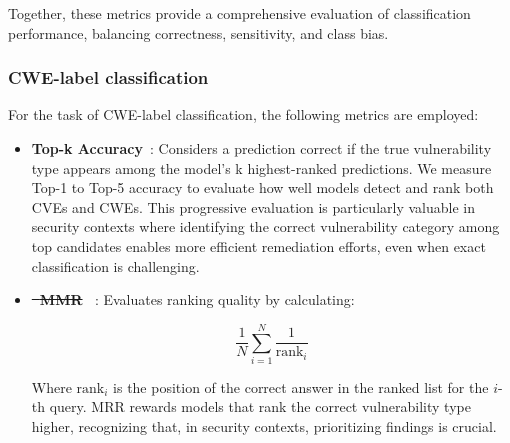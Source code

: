 \documentclass[lettersize,journal]{IEEEtran}
\makeatletter
\providecommand{\DIFadd}[1]{{\protect\color{blue}\uwave{#1}}} %
\providecommand{\DIFdel}[1]{{\protect\color{red}\sout{#1}}} %
\providecommand{\DIFaddbegin}{} %
\providecommand{\DIFaddend}{} %
\providecommand{\DIFdelbegin}{} %
\providecommand{\DIFdelend}{} %
\newcommand{\DIFscaledelfig}{0.5}
\newlength{\DIFdelgraphicswidth} %
\newlength{\DIFdelgraphicsheight} %
\newcommand{\DIFaddincludegraphics}[2][]{{\color{blue}\fbox{\DIFOincludegraphics[#1]{#2}}}} %
\newcommand{\DIFdelincludegraphics}[2][]{%
\sbox{\DIFdelgraphicsbox}{\DIFOincludegraphics[#1]{#2}}%
\settoboxwidth{\DIFdelgraphicswidth}{\DIFdelgraphicsbox} %
\settoboxtotalheight{\DIFdelgraphicsheight}{\DIFdelgraphicsbox} %
\scalebox{\DIFscaledelfig}{%
\parbox[b]{\DIFdelgraphicswidth}{\usebox{\DIFdelgraphicsbox}\\[-\baselineskip] \rule{\DIFdelgraphicswidth}{0em}}\llap{\resizebox{\DIFdelgraphicswidth}{\DIFdelgraphicsheight}{%
\setlength{\unitlength}{\DIFdelgraphicswidth}%
\begin{picture}(1,1)%
\thicklines\linethickness{2pt} %
{\color[rgb]{1,0,0}\put(0,0){\framebox(1,1){}}}%
{\color[rgb]{1,0,0}\put(0,0){\line( 1,1){1}}}%
{\color[rgb]{1,0,0}\put(0,1){\line(1,-1){1}}}%
\end{picture}%
}\hspace*{3pt}}} %
} %
\DeclareRobustCommand{\DIFaddbegin}{\DIFOaddbegin \let\includegraphics\DIFaddincludegraphics} %
\DeclareRobustCommand{\DIFaddend}{\DIFOaddend \let\includegraphics\DIFOincludegraphics} %
\DeclareRobustCommand{\DIFdelbegin}{\DIFOdelbegin \let\includegraphics\DIFdelincludegraphics} %
\DeclareRobustCommand{\DIFdelend}{\DIFOaddend \let\includegraphics\DIFOincludegraphics} %
\let\sout@orig\sout %
\renewcommand{\sout}[1]{\ifmmode\text{\sout@orig{\ensuremath{#1}}}\else\sout@orig{#1}\fi} %
\makeatother
\begin{document}
Together, these metrics provide a comprehensive evaluation of classification performance, balancing correctness, sensitivity, and class bias.

\subsubsection{CWE-label classification}
\label{section:cwe_metrics}
For the task of CWE-label classification, the following metrics are employed:

\begin{itemize}

	\item \textbf{Top-k Accuracy}~\cite{russakovsky2015imagenet}: Considers a prediction correct if the true vulnerability type appears among the model's k highest-ranked predictions. We measure Top-1 to Top-5 accuracy to evaluate how well models detect and rank both CVEs and CWEs. This progressive evaluation is particularly valuable in security contexts where identifying the correct vulnerability category among top candidates enables more efficient remediation efforts, even when exact classification is challenging.

	\item \textbf{\DIFdelbegin \DIFdel{\mbox{%
\gls{MMR}}\hskip0pt%
}\DIFdelend \DIFaddbegin \DIFadd{\mbox{%
\gls{MRR}}\hskip0pt%
}\DIFaddend }~\cite{craswell2009mean}: Evaluates ranking quality by calculating:

    \begin{equation}
        \frac{1}{N}\sum_{i=1}^{N}\frac{1}{\text{rank}_i}
    \end{equation}

    Where $\text{rank}_i$ is the position of the correct answer in the ranked list for the $i$-th query. MRR rewards models that rank the correct vulnerability type higher, recognizing that, in security contexts, prioritizing findings is crucial.


\end{itemize}
\end{document}
